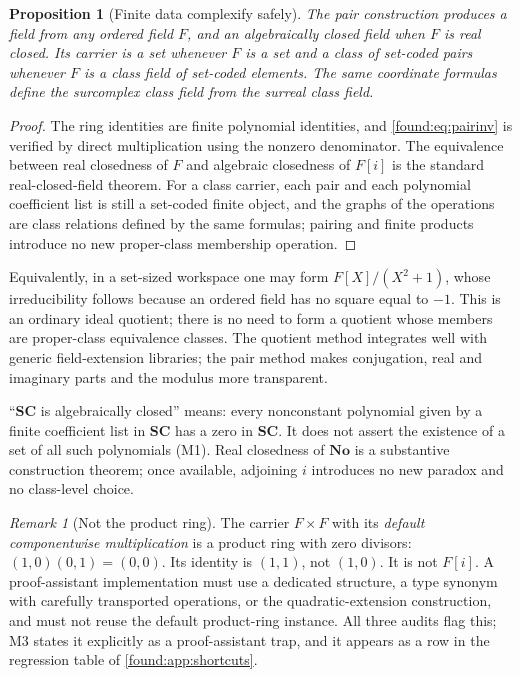 \documentclass[11pt,letterpaper]{article}
\numberwithin{equation}{section}
\newtheorem{proposition}[theorem]{Proposition}
\theoremstyle{definition}
\theoremstyle{remark}
\newtheorem{remark}[theorem]{Remark}
\newcommand{\No}{\mathbf{No}}
\newcommand{\SC}{\mathbf{SC}}
\begin{document}
\begin{proposition}[Finite data complexify safely]\label{found:prop:complex}
The pair construction produces a field from any ordered field $F$, and an
algebraically closed field when $F$ is real closed. Its carrier is a set
whenever $F$ is a set and a class of set-coded pairs whenever $F$ is a class
field of set-coded elements. The same coordinate formulas define the surcomplex
class field from the surreal class field.
\end{proposition}
\begin{proof}
The ring identities are finite polynomial identities, and
\eqref{found:eq:pairinv} is verified by direct multiplication using the nonzero
denominator. The equivalence between real closedness of $F$ and algebraic
closedness of $F[i]$ is the standard real-closed-field theorem. For a class
carrier, each pair and each polynomial coefficient list is still a set-coded
finite object, and the graphs of the operations are class relations defined by
the same formulas; pairing and finite products introduce no new proper-class
membership operation.
\end{proof}

Equivalently, in a set-sized workspace one may form $F[X]/(X^2+1)$, whose
irreducibility follows because an ordered field has no square equal to $-1$.
This is an ordinary ideal quotient; there is no need to form a quotient whose
members are proper-class equivalence classes. The quotient method integrates
well with generic field-extension libraries; the pair method makes conjugation,
real and imaginary parts and the modulus more transparent.

``$\SC$ is algebraically closed'' means: every nonconstant polynomial given by a
finite coefficient list in $\SC$ has a zero in $\SC$. It does not assert the
existence of a set of all such polynomials (M1). Real closedness of $\No$ is a
substantive construction theorem; once available, adjoining $i$ introduces no
new paradox and no class-level choice.

\begin{remark}[Not the product ring]\label{found:rem:productring}
The carrier $F\times F$ with its \emph{default componentwise multiplication} is
a product ring with zero divisors: $(1,0)(0,1)=(0,0)$. Its identity is $(1,1)$,
not $(1,0)$. It is not $F[i]$. A proof-assistant implementation must use a
dedicated structure, a type synonym with carefully transported operations, or
the quadratic-extension construction, and must not reuse the default
product-ring instance. All three audits flag this; M3 states it explicitly as a
proof-assistant trap, and it appears as a row in the regression table of
\cref{found:app:shortcuts}.
\end{remark}
\end{document}

